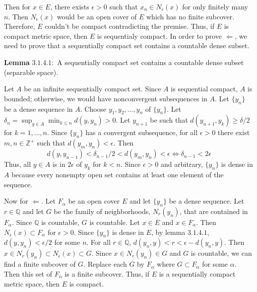 \begin{exercise}
  Then for \(x\in E\), there exists \(\epsilon > 0\) such that
  \(x_n\in N_{\epsilon}(x)\) for only finitely many \(n\).
  Then \(N_{\epsilon}(x)\) would be an open cover of \(E\) which has no finite
  subcover.
  Therefore, \(E\) couldn't be compact contradicting the premise.
  Thus, if \(E\) is compact metric space, then \(E\) is sequentialy compact.
  In order to prove \(\Leftarrow\), we need to prove that a sequentially
  compact set contains a countable dense subset.
  \par\smallskip
  \textbf{Lemma} \(\mathbold{3.1.4.1:}\) A sequentially compact set contains
  a countable dense subset (separable space).
  \par\smallskip
  Let \(A\) be an infinite sequentially compact set.
  Since \(A\) is sequential compact, \(A\) is bounded; otherwise, we would have
  nonconvergent subsequences in \(A\).
  Let \(\{y_n\}\) be a dense sequence in \(A\).
  Choose \(y_1,y_2,\ldots,y_n\) of \(\{y_n\}\).
  Let \(\delta_n = \sup_{y\in A}\min_{k\leq n}d(y,y_n) > 0\).
  Let \(y_{n + 1}\) be such that \(d(y_{n + 1},y_k)\geq\delta/2\) for
  \(k = 1,\ldots,n\).
  Since \(\{y_n\}\) has a convergent subsequence, for all \(\epsilon > 0\)
  there exist \(m,n\in\mathbb{Z}^+\) such that \(d(y_m,y_n) < \epsilon\).
  Then
  \[
    d(y,y_{n - 1}) < \delta_{n - 1}/2 < d(y_m,y_n) < \epsilon\iff
    \delta_{n - 1} < 2\epsilon
  \]
  Thus, all \(y\in A\) is in \(2\epsilon\) of \(y_k\) for \(k < n\).
  Since \(\epsilon > 0\) and arbitrary, \(\{y_n\}\) is dense in \(A\) because
  every nonempty open set contains at least one element of the sequence.
  \par\smallskip
  Now for \(\Leftarrow\).
  Let \(F_{\alpha}\) be an open cover \(E\) and let \(\{y_n\}\) be a dense
  sequence.
  Let \(r\in\mathbb{Q}\) and let \(G\) be the family of neighborhoods,
  \(N_r(y_n)\), that are contained in \(F_{\alpha}\).
  Since \(\mathbb{Q}\) is countable, \(G\) is countable.
  Let \(x\in E\) and \(x\in F_{\alpha}\).
  Then \(N_{\epsilon}(x)\subset F_{\alpha}\) for \(\epsilon > 0\).
  Since \(\{y_n\}\) is dense in \(E\), by lemma \(3.1.4.1\),
  \(d(y,y_n) < \epsilon/2\) for some \(n\).
  For all \(r\in\mathbb{Q}\), \(d(y_n,y) < r < \epsilon - d(y_n,y)\).
  Then \(x\in N_r(y_n)\subset N_{\epsilon}(x)\subset G\).
  Since \(x\in N_r(y_n)\in G\) and \(G\) is countable, we can find a finite
  subcover of \(G\).
  Replace each \(G\) by \(F_{\alpha}\) where \(G\subset F_{\alpha}\) for some
  \(\alpha\).
  Then this set of \(F_{\alpha}\) is a finite subcover.
  Thus, if \(E\) is a sequentially compact metric space, then \(E\) is compact.

\end{exercise}
